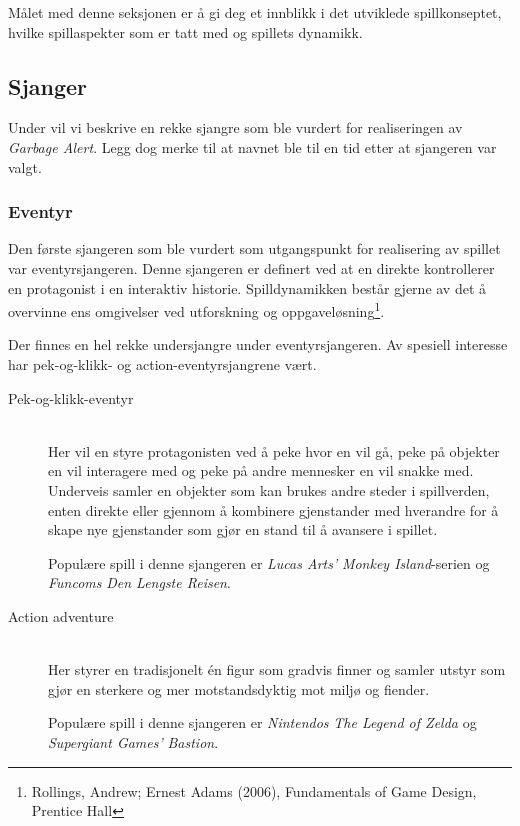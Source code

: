 Målet med denne seksjonen er å gi deg et innblikk i det utviklede
spillkonseptet, hvilke spillaspekter som er tatt med og spillets
dynamikk.


\subsection{Sjanger}


Under vil vi beskrive en rekke sjangre som ble vurdert for realiseringen av \emph{Garbage Alert}. Legg dog merke til at navnet ble til en tid etter at sjangeren var valgt.

\subsubsection{Eventyr}\label{sec:eventyr}
Den første sjangeren som ble vurdert som utgangspunkt for realisering av spillet var eventyrsjangeren. Denne sjangeren er definert ved at en direkte kontrollerer en protagonist i en interaktiv historie. Spilldynamikken består gjerne av det å overvinne ens omgivelser ved utforskning og oppgaveløsning\footnote{Rollings, Andrew; Ernest Adams (2006), Fundamentals of Game Design, Prentice Hall}.

Der finnes en hel rekke undersjangre under eventyrsjangeren. Av spesiell interesse har pek-og-klikk- og action-eventyrsjangrene vært.

\begin{description}

	\item[Pek-og-klikk-eventyr] \hfill \\

	Her vil en styre protagonisten ved å peke hvor en vil gå, peke på objekter en vil interagere med og peke på andre mennesker en vil snakke med. Underveis samler en objekter som kan brukes andre steder i spillverden, enten direkte eller gjennom å kombinere gjenstander med hverandre for å skape nye gjenstander som gjør en  stand til å avansere i spillet.

	Populære spill i denne sjangeren er \emph{Lucas Arts'} \emph{Monkey Island}-serien og \emph{Funcoms} \emph{Den Lengste Reisen}.

	\item[Action adventure] \hfill \\

	Her styrer en tradisjonelt én figur som gradvis finner og samler utstyr som gjør en sterkere og mer motstandsdyktig mot miljø og fiender.


	Populære spill i denne sjangeren er \emph{Nintendos} \emph{The Legend of Zelda} og \emph{Supergiant Games'} \emph{Bastion}.

\end{description}

